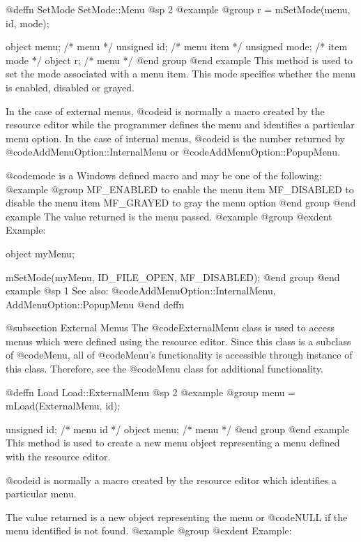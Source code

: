 @deffn {SetMode} SetMode::Menu
@sp 2
@example
@group
r = mSetMode(menu, id, mode);

object  menu;   /*  menu       */
unsigned  id;   /*  menu item  */
unsigned  mode; /*  item mode  */
object    r;    /*  menu       */
@end group
@end example
This method is used to set the mode associated with a menu item.  This
mode specifies whether the menu is enabled, disabled or grayed.

In the case of external menus, @code{id} is normally a macro created by
the resource editor while the programmer defines the menu and identifies
a particular menu option.  In the case of internal menus, @code{id}
is the number returned by @code{AddMenuOption::InternalMenu} or
@code{AddMenuOption::PopupMenu}.

@code{mode} is a Windows defined macro and may be one of the following:
@example
@group
MF_ENABLED      to enable the menu item
MF_DISABLED     to disable the menu item
MF_GRAYED       to gray the menu option
@end group
@end example
The value returned is the menu passed.
@example
@group
@exdent Example:

object  myMenu;

mSetMode(myMenu, ID_FILE_OPEN, MF_DISABLED);
@end group
@end example
@sp 1
See also:  @code{AddMenuOption::InternalMenu, AddMenuOption::PopupMenu}
@end deffn






@subsection External Menus
The @code{ExternalMenu} class is used to access menus which were defined
using the resource editor.  Since this class is a subclass of @code{Menu},
all of @code{Menu}'s functionality is accessible through instance of this
class.  Therefore, see the @code{Menu} class for additional functionality.







@deffn {Load} Load::ExternalMenu
@sp 2
@example
@group
menu = mLoad(ExternalMenu, id);

unsigned  id;   /*  menu id  */
object  menu;   /*  menu     */
@end group
@end example
This method is used to create a new menu object representing a menu defined
with the resource editor.

@code{id} is normally a macro created by the resource editor which identifies
a particular menu.

The value returned is a new object representing the menu or @code{NULL} if
the menu identified is not found.
@example
@group
@exdent Example:

